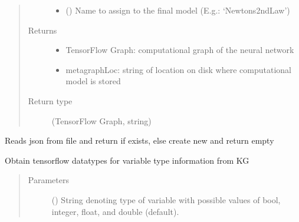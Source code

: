\documentclass[letterpaper,10pt,english]{sphinxmanual}
\begin{document}
\begin{fulllineitems}
\begin{fulllineitems}
\begin{quote}
\begin{description}
\begin{itemize}
\item {} 
 () \textendash{} Name to assign to the final model (E.g.: ‘Newtons2ndLaw’)

\end{itemize}

\item[{Returns}] \leavevmode
\begin{itemize}
\item {} 
TensorFlow Graph: computational graph of the neural network

\item {} 
metagraphLoc: string of location on disk where computational model is stored

\end{itemize}


\item[{Return type}] \leavevmode
(TensorFlow Graph, string)

\end{description}\end{quote}

\end{fulllineitems}


\begin{fulllineitems}
\label{\detokenize{index:kChain.kChainModel._getDefaultValues}}
Reads json from file and return if exists, else create new and return empty

\end{fulllineitems}


\begin{fulllineitems}
\label{\detokenize{index:kChain.kChainModel._getVarType}}
Obtain tensorflow datatypes for variable type information from KG
\begin{quote}\begin{description}
\item[{Parameters}] \leavevmode
{} () \textendash{} String denoting type of variable with possible values of bool,
integer, float, and double (default).


\end{description}
\end{quote}
\end{fulllineitems}
\end{fulllineitems}
\end{document}
